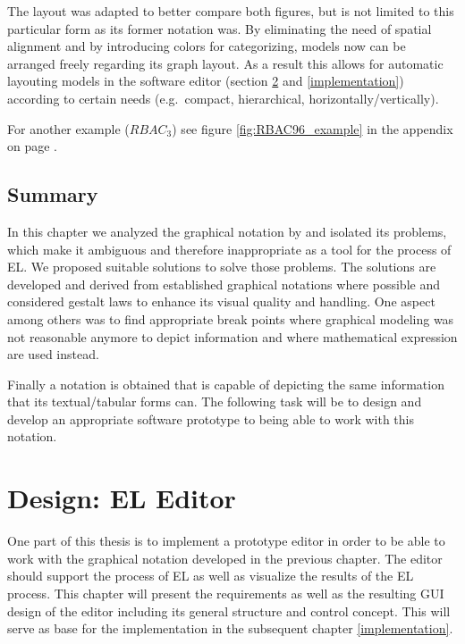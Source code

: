 \documentclass[twoside, openright, 12pt]{book}
\begin{document}
\noindent
The layout was adapted to better compare both figures, but is not limited to this particular form as its former notation was.
By eliminating the need of spatial alignment and by introducing colors for categorizing, models now can be arranged freely regarding its graph layout.
As a result this allows for automatic layouting models in the software editor (section \ref{editor_design} and \ref{implementation}) according to certain needs (e.g.~compact, hierarchical, horizontally/vertically).

For another example ($RBAC_3$) see figure \ref{fig:RBAC96_example} in the appendix on page \pageref{fig:RBAC96_example}.




\section{Summary}
\label{gsl_summary}
In this chapter we analyzed the graphical notation by \cite{Amthor18} and isolated its problems, which make it ambiguous and therefore inappropriate as a tool for the process of EL.
We proposed suitable solutions to solve those problems.
The solutions are developed and derived from established graphical notations where possible and considered gestalt laws to enhance its visual quality and handling.
One aspect among others was to find appropriate break points where graphical modeling was not reasonable anymore to depict information and where mathematical expression are used instead.

Finally a notation is obtained that is capable of depicting the same information that its textual/tabular forms can.
The following task will be to design and develop an appropriate software prototype to being able to work with this notation.





\cleardoublepage
\chapter{Design: EL Editor}
\label{editor_design}
One part of this thesis is to implement a prototype editor in order to be able to work with the graphical notation developed in the previous chapter.
The editor should support the process of EL as well as visualize the results of the EL process.
This chapter will present the requirements as well as the resulting GUI design of the editor including its general structure and control concept.
This will serve as base for the implementation in the subsequent chapter \ref{implementation}.
\end{document}
